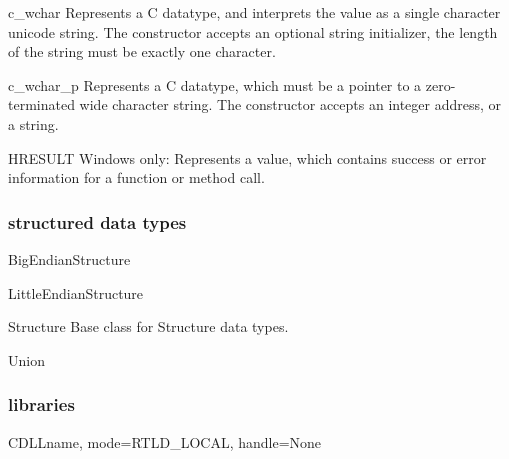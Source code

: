 \begin{classdesc}{c_wchar}{}
Represents a C  datatype, and interprets the value as a
single character unicode string.  The constructor accepts an optional
string initializer, the length of the string must be exactly one
character.
\end{classdesc}

\begin{classdesc}{c_wchar_p}{}
Represents a C  datatype, which must be a pointer to a
zero-terminated wide character string.  The constructor accepts an
integer address, or a string.
\end{classdesc}

\begin{classdesc}{HRESULT}{}
Windows only: Represents a  value, which contains
success or error information for a function or method call.
\end{classdesc}

\subsubsection{structured data types}

\begin{classdesc}{BigEndianStructure}{}
\end{classdesc}

\begin{classdesc}{LittleEndianStructure}{}
\end{classdesc}

\begin{classdesc}{Structure}{}
Base class for Structure data types.

\end{classdesc}

\begin{classdesc}{Union}{}
\end{classdesc}


\subsubsection{libraries}

\begin{classdesc}{CDLL}{name, mode=RTLD_LOCAL, handle=None}
\end{classdesc}

